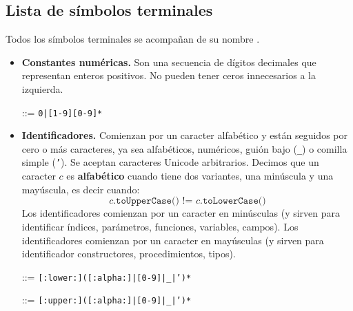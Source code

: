 \documentclass{article}
\begin{document}
\subsection{Lista de s\'imbolos terminales}

Todos los s\'imbolos terminales se acompa\~nan de su nombre .\bigskip

\begin{itemize}

\item {\bf Constantes num\'ericas.}
  Son una secuencia de d\'igitos decimales que representan enteros positivos.
  No pueden tener ceros innecesarios a la izquierda.
  \begin{center}
     ::= \texttt{0|[1-9][0-9]*}
  \end{center}

\item {\bf Identificadores.}
  Comienzan por un caracter alfab\'etico y
  est\'an seguidos por cero o m\'as caracteres,
  ya sea alfab\'eticos, num\'ericos, gui\'on bajo (\texttt{\_}) o comilla simple (\texttt{'}).
  Se aceptan caracteres Unicode arbitrarios. Decimos que un caracter $c$ es {\bf alfab\'etico}
  cuando tiene dos variantes, una min\'uscula y una may\'uscula, es decir cuando:
  \[
  \texttt{$c$.toUpperCase() != $c$.toLowerCase()}
  \]
  Los identificadores  comienzan por un caracter en min\'usculas
  (y sirven para identificar \'indices, par\'ametros, funciones, variables, campos).
  Los identificadores  comienzan por un caracter en may\'usculas
  (y sirven para identificador constructores, procedimientos, tipos).
  \begin{center}
     ::= \texttt{[:lower:]([:alpha:]|[0-9]|\_|')*}
  \end{center}
  \begin{center}
     ::= \texttt{[:upper:]([:alpha:]|[0-9]|\_|')*}
  \end{center}


\end{itemize}
\end{document}
